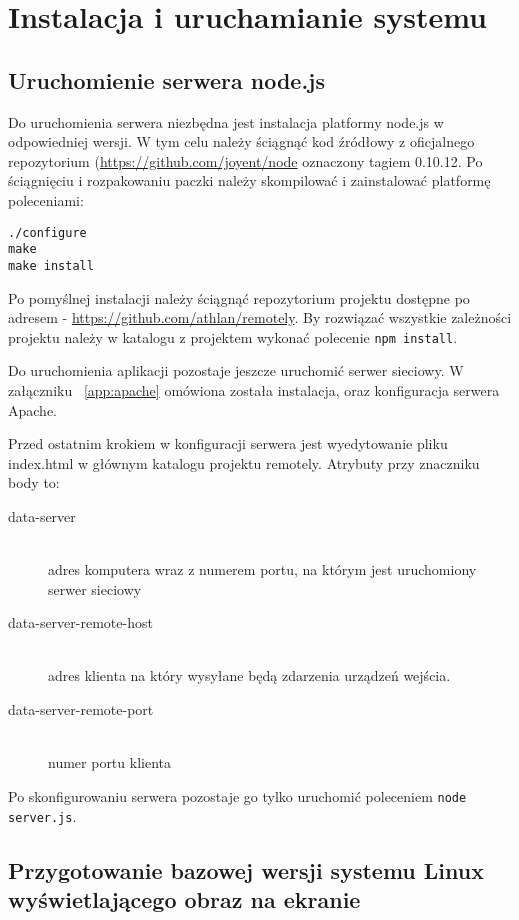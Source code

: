 \newpage
\section{Instalacja i uruchamianie systemu}

\subsection{Uruchomienie serwera node.js}
\label{subsub:setup-server-nodejs}

Do uruchomienia serwera niezbędna jest instalacja platformy node.js w odpowiedniej wersji. W tym celu należy ściągnąć kod źródłowy z oficjalnego repozytorium (\url{https://github.com/joyent/node} oznaczony tagiem 0.10.12. Po ściągnięciu i rozpakowaniu paczki należy skompilować i zainstalować platformę poleceniami:

\begin{lstlisting}
./configure
make
make install
\end{lstlisting}

Po pomyślnej instalacji należy ściągnąć repozytorium projektu dostępne po adresem - \url{https://github.com/athlan/remotely}. By rozwiązać wszystkie zależności projektu należy w katalogu z projektem wykonać polecenie \lstinline{npm install}.
\par
Do uruchomienia aplikacji pozostaje jeszcze uruchomić serwer sieciowy. W załączniku ~\ref{app:apache} omówiona została instalacja, oraz konfiguracja serwera Apache.
\par
Przed ostatnim krokiem w konfiguracji serwera jest wyedytowanie pliku index.html w głównym katalogu projektu remotely. Atrybuty przy znaczniku body to:
\begin{description}
	\item[data-server] \hfill \\
		adres komputera wraz z numerem portu, na którym jest uruchomiony serwer sieciowy
	\item[data-server-remote-host] \hfill \\
		adres klienta na który wysyłane będą zdarzenia urządzeń wejścia.
	\item[data-server-remote-port] \hfill \\
		numer portu klienta
\end{description}
\par
Po skonfigurowaniu serwera pozostaje go tylko uruchomić poleceniem \lstinline{node server.js}.


\subsection{Przygotowanie bazowej wersji systemu Linux wyświetlającego obraz na ekranie}


